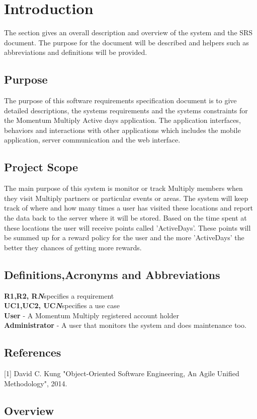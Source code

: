 \documentclass[11pt]{article}
\begin{document}
\newpage
\tableofcontents
\section{Introduction}
The section gives an overall description and overview of the system and the SRS document. The purpose for the document will be described and helpers such as abbreviations and definitions will be provided.
\subsection{Purpose}
The purpose of this software requirements specification document is to give detailed descriptions, the systems requirements and the systems constraints for the Momentum Multiply Active days application. The application interfaces, behaviors and interactions with other applications which includes the mobile application, server communication and the web interface.
\subsection{Project Scope}
The main purpose of this system is monitor or track Multiply members when they visit Multiply partners or particular events or areas. The system will keep track of where and how many times a user has visited these locations and report the data back to the server where it will be stored. Based on the time spent at these locations the user will receive points called 'ActiveDays'. These points will be summed up for a reward policy for the user and the more 'ActiveDays' the better they chances of getting more rewards. 
\subsection{Definitions,Acronyms and Abbreviations}
\textbf{R1,R2, R\textit{N}}specifies a requirement \\
\textbf{UC1,UC2, UC\textit{N}}specifies a use case \\
\textbf{User} - A Momentum Multiply registered account holder\\
\textbf{Administrator} - A user that monitors the system and does maintenance too.
\subsection{References}
[1] David C. Kung "Object-Oriented Software Engineering, An Agile Unified Methodology", 2014.
\subsection{Overview}
\end{document}
